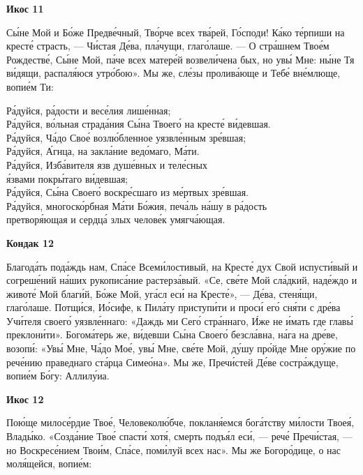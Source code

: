 \documentclass[14pt,article,oneside]{memoir}
\begin{document}
\begin{center}
  \textbf{Икос 11}
\end{center}

Сы́не Мой и Бо́же Предве́чный, Тво́рче всех тва́рей, Го́споди! Ка́ко те́рпиши на кресте́ страсть, — Чи́стая Де́ва, пла́чущи, глаго́лаше. — О стра́шнем Твое́м Рождестве́, Сы́не Мой, па́че всех матере́й возвели́чена бых, но увы́ Мне: ны́не Тя ви́дящи, распаля́юся утро́бою». Мы же, сле́зы пролива́юще и Тебе́ вне́млюще, вопие́м Ти:

\noindent Ра́дуйся, ра́дости и весе́лия лише́нная;\\ Ра́дуйся, во́льная страда́ния Сы́на Твоего́ на кресте́ ви́девшая.\\
Ра́дуйся, Ча́до Свое́ возлю́бленное уязвле́нным зре́вшая;\\ Ра́дуйся, А́гнца, на закла́ние ведо́маго, Ма́ти.\\
Ра́дуйся, Изба́вителя язв душе́вных и теле́сных\\ \vin я́звами покры́таго ви́девшая;\\ Ра́дуйся, Сы́на Своего́ воскре́сшаго из ме́ртвых зре́вшая.\\
Ра́дуйся, многоско́рбная Ма́ти Бо́жия, печа́ль на́шу в ра́дость\\ \vin претворя́ющая и сердца́ злых челове́к умягча́ющая.

\begin{center}
  \textbf{Кондак 12}
\end{center}

Благода́ть пода́ждь нам, Спа́се Всеми́лостивый, на Кресте́ дух Свой испусти́вый и согреше́ний на́ших рукописа́ние растерза́вый. «Се, све́те Мой сла́дкий, наде́ждо и животе́ Мой благи́й, Бо́же Мой, уга́сл еси́ на Кресте́», — Де́ва, стеня́щи, глаго́лаше. Потщи́ся, Ио́сифе, к Пила́ту приступи́ти и проси́ его́ сня́ти с дре́ва Учи́теля своего́ уязвле́ннаго: «Даждь ми Сего́ стра́ннаго, И́же не и́мать где главы́ преклони́ти». Богома́терь же, ви́девши Сы́на Своего́ безсла́вна, на́га на дре́ве, возопи́: «Увы́ Мне, Ча́до Мое́, увы́ Мне, све́те Мой, ду́шу про́йде Мне ору́жие по рече́нию праведнаго ста́рца Симео́на». Мы же, Пречи́стей Де́ве состра́ждуще, вопие́м Бо́гу: Аллилу́иа.

\begin{center}
  \textbf{Икос 12}
\end{center}

Пою́ще милосе́рдие Твое́, Человеколю́бче, покланя́емся бога́тству ми́лости Твоея́, Влады́ко. «Созда́ние Твое́ спасти́ хотя́, смерть подъя́л еси́, — рече́ Пречи́стая, — но Воскресе́нием Твои́м, Спа́се, поми́луй всех нас». Мы же Богоро́дице, о нас моля́щейся, вопие́м:
\end{document}
